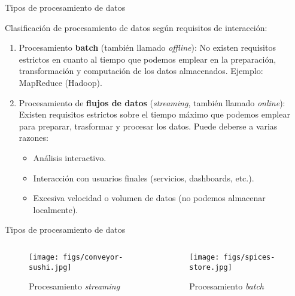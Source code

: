 
\begin{frame}{Tipos de procesamiento de datos}
 \begin{wideitemize}
 
 \item Clasificación de procesamiento de datos según requisitos de interacción:
 
\end{wideitemize}

\begin{enumerate}
   \item Procesamiento \textbf{batch} (también llamado \textit{offline}): No
   existen requisitos estrictos en cuanto al tiempo que podemos emplear en
   la preparación, transformación y computación de los datos almacenados.
   Ejemplo: MapReduce (Hadoop).\\
   
   \item Procesamiento de \textbf{flujos de datos} (\textit{streaming}, también
   llamado \textit{online}): Existen requisitos estrictos sobre el tiempo máximo
   que podemos emplear para preparar, trasformar y procesar los datos. Puede
   deberse a varias razones:
   \begin{itemize}
    \item Análisis interactivo.
    \item Interacción con usuarios finales (servicios, dashboards, etc.).
    \item Excesiva velocidad o volumen de datos (no podemos almacenar localmente).
   \end{itemize}


  \end{enumerate}

\end{frame}


\begin{frame}{Tipos de procesamiento de datos}
 \begin{columns}[T]
    \begin{column}{.5\textwidth}
    \begin{figure}
    \texttt{[image: figs/conveyor-sushi.jpg]} 
    \caption{Procesamiento \textit{streaming}}
    \end{figure}

    \end{column}
    \begin{column}{.5\textwidth}
    \vspace*{1.7cm}
    \begin{figure}
    \texttt{[image: figs/spices-store.jpg]}
    \caption{Procesamiento \textit{batch}}
    \end{figure}
    \end{column}
  \end{columns}

\end{frame}

